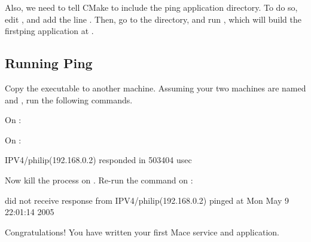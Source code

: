 

Also, we need to tell CMake to include the ping application directory.
To do so, edit , and add the line
.  Then, go to the 
directory, and run , which will build the
firstping application at .

\subsection{Running Ping}
\label{sec:running-ping}

Copy the  executable to another machine.  Assuming your
two machines are named  and , run the
following commands.

\noindent
On :

\begin{screen}
\end{screen}

\noindent
On :

\begin{screen}
IPV4/philip(192.168.0.2) responded in 503404 usec
\end{screen}

\noindent
Now kill the  process on .  Re-run
the command on :

\small
\begin{screen}
did not receive response from IPV4/philip(192.168.0.2) pinged at Mon May  9 22:01:14 2005
\end{screen}
\normalsize

\noindent
Congratulations!  You have written your first Mace service and
application.

